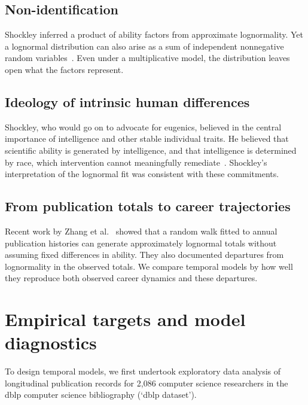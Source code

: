 \documentclass[9pt,twocolumn,twoside]{pnas-new}
\begin{document}
\subsection*{Non-identification}\label{subsec:intro_nonID}
Shockley inferred a product of ability factors from approximate
lognormality. Yet a lognormal distribution can also arise as a sum
of independent nonnegative random variables~\cite{thorinInfiniteDivisibilityLognormal1977}.
Even under a multiplicative model, the distribution leaves open what
the factors represent.

\subsection*{Ideology of intrinsic human differences}\label{subsec:intro_eugenics}
Shockley, who would go on to advocate for eugenics, believed in the central importance of intelligence and other stable individual traits. He believed that scientific ability is generated by intelligence, and that intelligence is determined by race, which intervention cannot meaningfully remediate~\cite{shockley_lectures_on_eugenics_and_research_taboos1967, shockley_public_hereditarian_and_eugenic_views1965}. Shockley's interpretation of the lognormal fit was consistent with these commitments. 

\Endparasplit


\subsection*{From publication totals to career trajectories}\label{subsec:intro_tots-to-trajs}
Recent work by Zhang et al.~\cite{random_walk_reproduces_productivity_trajectories_zhang2026}
showed that a random walk fitted to annual publication histories can
generate approximately lognormal totals without assuming fixed
differences in ability. They also documented departures from
lognormality in the observed totals. We compare temporal models by how
well they reproduce both observed career dynamics and these departures.

\section*{Empirical targets and model diagnostics}\label{sec:empirical_constraints}
To design temporal models, we first undertook exploratory data analysis of longitudinal publication records for 2,086 computer science researchers in the dblp computer science bibliography (`dblp dataset'). 
\end{document}
